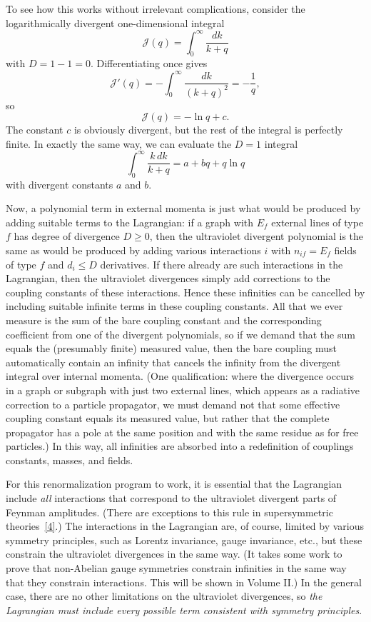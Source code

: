 To see how this works without irrelevant complications, consider the
logarithmically divergent one-dimensional integral
\[
  \mathcal{J}(q)=\int_0^\infty\frac{dk}{k+q}
\]
with $D=1-1=0$. Differentiating once gives
\[
  \mathcal{J}'(q)=-\int_0^\infty\frac{dk}{(k+q)^2}=-\frac1q,
\]
so
\[
  \mathcal{J}(q)=-\ln q+c.
\]
The constant $c$ is obviously divergent, but the rest of the integral is
perfectly finite. In exactly the same way, we can evaluate the $D=1$
integral
\[
  \int_0^\infty\frac{k\,dk}{k+q}=a+bq+q\ln q
\]
with divergent constants $a$ and $b$.

Now, a polynomial term in external momenta is just what would be produced
by adding suitable terms to the Lagrangian: if a graph with $E_f$ external
lines of type $f$ has degree of divergence $D\geq0$, then the ultraviolet
divergent polynomial is the same as would be produced by adding various
interactions $i$ with $n_{if}=E_f$ fields of type $f$ and $d_i\leq D$
derivatives. If there already are such interactions in the Lagrangian, then
the ultraviolet divergences simply add corrections to the coupling constants
of these interactions. Hence these infinities can be cancelled by including
suitable infinite terms in these coupling constants. All that we ever
measure is the sum of the bare coupling constant and the corresponding
coefficient from one of the divergent polynomials, so if we demand that the
sum equals the (presumably finite) measured value, then the bare coupling
must automatically contain an infinity that cancels the infinity from the
divergent integral over internal momenta. (One qualification: where the
divergence occurs in a graph or subgraph with just two external lines, which
appears as a radiative correction to a particle propagator, we must demand
not that some effective coupling constant equals its measured value, but
rather that the complete propagator has a pole at the same position and with
the same residue as for free particles.) In this way, all infinities are
absorbed into a redefinition of couplings constants, masses, and fields.

For this renormalization program to work, it is essential that the Lagrangian
include \emph{all} interactions that correspond to the ultraviolet divergent
parts of Feynman amplitudes. (There are exceptions to this rule in
supersymmetric theories~\hyperref[ref:12.4]{[4]}.) The interactions in the
Lagrangian are, of course, limited by various symmetry principles, such as
Lorentz invariance, gauge invariance, etc., but these constrain the
ultraviolet divergences in the same way. (It takes some work to prove that
non-Abelian gauge symmetries constrain infinities in the same way that they
constrain interactions. This will be shown in Volume II.) In the general
case, there are no other limitations on the ultraviolet divergences, so
\emph{the Lagrangian must include every possible term consistent with
symmetry principles}.

